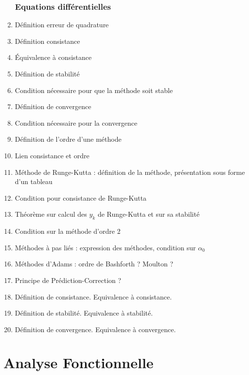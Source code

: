 \documentclass{article}
\begin{document}
\begin{enumerate}
\section{Equations différentielles}
\item Définition erreur de quadrature
\item Définition consistance
\item Équivalence à consistance
\item Définition de stabilité
\item Condition nécessaire pour que la méthode soit stable
\item Définition de convergence
\item Condition nécessaire pour la convergence
\item Définition de l'ordre d'une méthode
\item Lien consistance et ordre
\item Méthode de Runge-Kutta : définition de la méthode, présentation sous forme d'un tableau
\item Condition pour consistance de Runge-Kutta
\item Théorème sur calcul des $y_k$ de Runge-Kutta et sur sa stabilité
\item Condition sur la méthode d'ordre 2
\item Méthodes à pas liés : expression des méthodes, condition sur $\alpha_0$
\item Méthodes d'Adams : ordre de Bashforth ? Moulton ?
\item Principe de Prédiction-Correction ?
\item Définition de consistance. Equivalence à consistance.
\item Définition de stabilité. Equivalence à stabilité.
\item Définition de convergence. Equivalence à convergence. 
\end{enumerate}

\newpage
\part{Analyse Fonctionnelle}
\end{document}
